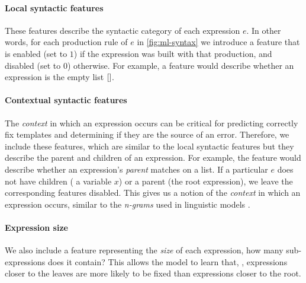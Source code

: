 \paragraph{Local syntactic features}
These features describe the syntactic category of each expression $e$. In other
words, for each production rule of $e$ in \autoref{fig:ml-syntax} we introduce a
feature that is enabled (set to $1$) if the expression was built with that
production, and disabled (set to $0$) otherwise. For example, a \IsNil feature
would describe whether an expression is the empty list $\mathtt{[]}$.


\paragraph{Contextual syntactic features}
The \emph{context} in which an expression occurs can be critical for predicting
correctly fix templates and determining if they are the source of an error.
Therefore, we include these features, which are similar to the local syntactic
features but they describe the parent and children of an expression. For
example, the \IsCaseListP feature would describe whether an expression's
\emph{parent} matches on a list. If a particular $e$ does not have children (\eg
a variable $x$) or a parent (\ie the root expression), we leave the
corresponding features disabled. This gives us a notion of the \emph{context} in
which an expression occurs, similar to the \emph{n-grams} used in linguistic
models \citep{Hindle2012-hf,Gabel2010-el}.

\paragraph{Expression size}
We also include a feature representing the \emph{size} of each expression, \ie
how many sub-expressions does it contain?
This allows the model to learn that, \eg, expressions closer to the leaves are
more likely to be fixed than expressions closer to the root.

